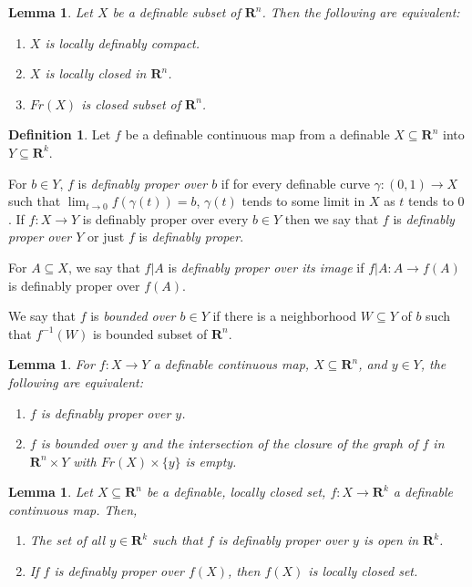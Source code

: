 \documentclass{amsart}
\newtheorem{lemma}[theorem]{Lemma}
\theoremstyle{definition}
\newtheorem{definition}[theorem]{Definition}
\numberwithin{equation}{section}
\begin{document}
\begin{lemma}
  Let $X$ be a definable subset of $\mathbf{R}^n$.
  Then the following are equivalent:
  \begin{enumerate}[label = {(\roman*)}]
    \item $X$ is locally definably compact.
    \item $X$ is locally closed in $\mathbf{R}^n$.
    \item $Fr(X)$ is closed subset of $\mathbf{R}^n$.
  \end{enumerate}
\end{lemma}

\begin{definition}
  Let $f$ be a definable continuous map from a definable $X \subseteq \mathbf{R}^n$ into $Y \subseteq \mathbf{R}^k$.

  For $b \in Y$, $f$ is \emph{definably proper over $b$} if for every definable curve $\gamma:(0,1) \to X$ such that $\lim_{t\to 0} f(\gamma(t)) = b$,
  $\gamma(t)$ tends to some limit in $X$ as $t$ tends to $0$.
  If $f: X \to Y$ is definably proper over every $b\in Y$ then
  we say that $f$ is \emph{definably proper over $Y$} or just 
  $f$ is \emph{definably proper}.

  For $A \subseteq X$, we say that $f|A$ is \emph{definably proper over its image} if $f|A : A \to f(A)$ is definably proper over $f(A)$.

  We say that $f$ is \emph{bounded over $b\in Y$} if there is a neighborhood $W \subseteq Y$ of $b$ such that $f^{-1}(W)$ is bounded subset of $\mathbf{R}^n$. 
\end{definition}

\begin{lemma}
  For $f: X \to Y$ a definable continuous map,
  $X \subseteq \mathbf{R}^n$,
  and $y\in Y$, the following are equivalent:
  \begin{enumerate}[label = {(\roman*)}]
    \item $f$ is definably proper over $y$.
    \item $f$ is bounded over $y$ and the intersection of the closure of the graph of $f$ 
      in $\mathbf{R}^n\times Y$ with $Fr(X)\times \{y\}$ is empty.
  \end{enumerate}
\end{lemma}

\begin{lemma}
  Let $X \subseteq \mathbf{R}^n$ be a definable,
  locally closed set, $f: X \to \mathbf{R}^k$ a definable
  continuous map. Then,
  \begin{enumerate}[label = {(\roman*)}]
    \item The set of all $y \in \mathbf{R}^k$ such that $f$ is definably proper over $y$ is open in $\mathbf{R}^k$.
    \item If $f$ is definably proper over $f(X)$, then $f(X)$ is locally closed set.
  \end{enumerate}
\end{lemma}
\end{document}
